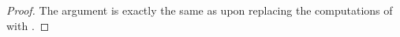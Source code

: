 \begin{proof}
    The argument is exactly the same as  upon replacing the computations of  with .
\end{proof}